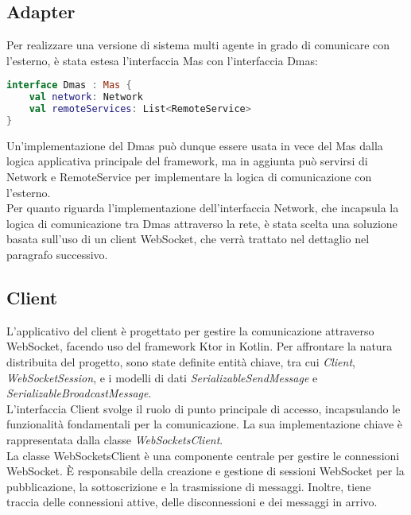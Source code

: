 \subsection{Adapter}
Per realizzare una versione di sistema multi agente in grado di comunicare con l'esterno, è stata estesa l'interfaccia Mas con l'interfaccia Dmas:

\begin{lstlisting}[language=Kotlin]
interface Dmas : Mas {
    val network: Network
    val remoteServices: List<RemoteService>
}
\end{lstlisting}

Un'implementazione del Dmas può dunque essere usata in vece del Mas dalla logica applicativa principale del framework, ma in aggiunta può servirsi di Network e RemoteService per
implementare la logica di comunicazione con l'esterno.\\

Per quanto riguarda l'implementazione dell'interfaccia Network, che incapsula la logica di comunicazione tra Dmas attraverso la rete, è stata scelta una soluzione basata sull'uso
di un client WebSocket, che verrà trattato nel dettaglio nel paragrafo successivo.\\

\subsection{Client}
L'applicativo del client è progettato per gestire la comunicazione attraverso WebSocket,
facendo uso del framework Ktor in Kotlin. Per affrontare la natura distribuita del progetto,
sono state definite entità chiave, tra cui \textit{Client}, \textit{WebSocketSession}, e i modelli di dati
\textit{SerializableSendMessage} e \textit{SerializableBroadcastMessage}. \\

L'interfaccia Client svolge il ruolo di punto principale di accesso, incapsulando le funzionalità fondamentali per la
comunicazione. La sua implementazione chiave è rappresentata dalla classe \textit{WebSocketsClient}.\\

La classe WebSocketsClient è una componente centrale per gestire le connessioni WebSocket.
È responsabile della creazione e gestione di sessioni WebSocket per la pubblicazione,
la sottoscrizione e la trasmissione di messaggi. Inoltre, tiene traccia delle connessioni attive, delle disconnessioni e dei messaggi in arrivo.\\

